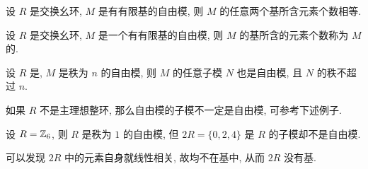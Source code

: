 \begin{lemma}
	
\end{lemma}

\begin{theorem}
	设 $R$ 是交换幺环, $M$ 是有有限基的自由模, 则 $M$ 的任意两个基所含元素个数相等.
\end{theorem}

\begin{definition}
	设 $R$ 是交换幺环, $M$ 是一个有有限基的自由模, 则 $M$ 的基所含的元素个数称为 $M$ 的.
\end{definition}

\begin{theorem}
	设 $R$ 是, $M$ 是秩为 $n$ 的自由模, 则 $M$ 的任意子模 $N$ 也是自由模, 且 $N$ 的秩不超过 $n$.
\end{theorem}

\begin{remark*}
	如果 $R$ 不是主理想整环, 那么自由模的子模不一定是自由模, 可参考下述例子.
\end{remark*}

\begin{example}
	设 $R=\mathbb Z_6$, 则 $R$ 是秩为 $1$ 的自由模, 但 $2R=\{0,2,4\}$ 是 $R$ 的子模却不是自由模.
	
	可以发现 $2R$ 中的元素自身就线性相关, 故均不在基中, 从而 $2R$ 没有基.
\end{example}